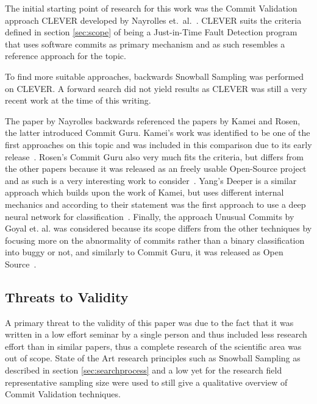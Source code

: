 The initial starting point of research for this work was the Commit Validation approach CLEVER developed by Nayrolles et.~al.~\cite{Nayrolles2018}. CLEVER suits the criteria defined in section \ref{sec:scope} of being a Just-in-Time Fault Detection program that uses software commits as primary mechanism and as such resembles a reference approach for the topic.  

To find more suitable approaches, backwards Snowball Sampling was performed on CLEVER. A forward search did not yield results as CLEVER was still a very recent work at the time of this writing.

The paper by Nayrolles backwards referenced the papers by Kamei and Rosen, the latter introduced Commit Guru. Kamei's work was identified to be one of the first approaches on this topic and was included in this comparison due to its early release~\cite{Kamei2013}. Rosen's Commit Guru also very much fits the criteria, but differs from the other papers because it was released as an freely usable Open-Source project and as such is a very interesting work to consider~\cite{Rosen2015}. Yang's Deeper is a similar approach which builds upon the work of Kamei, but uses different internal mechanics and according to their statement was the first approach to use a deep neural network for classification~\cite{Yang2015}. Finally, the approach Unusual Commits by Goyal et. al. was considered because its scope differs from the other techniques by focusing more on the abnormality of commits rather than a binary classification into buggy or not, and similarly to Commit Guru, it was released as Open Source~\cite{Goyal2017}.

\subsection{Threats to Validity}

A primary threat to the validity of this paper was due to the fact that it was written in a low effort seminar by a single person and thus included less research effort than in similar papers, thus a complete research of the scientific area was out of scope. State of the Art research principles such as Snowball Sampling as described in section \ref{sec:searchprocess} and a low yet for the research field representative sampling size were used to still give a qualitative overview of Commit Validation techniques.

